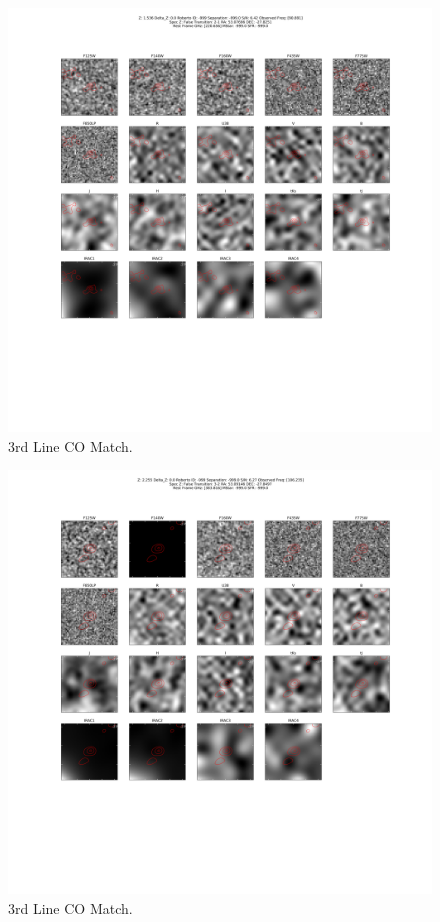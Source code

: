 \begin{figure}[tbp]
\centering \includegraphics[width=120mm]{Matched/ASPECS_Cutout_27.png}
\caption{3rd Line CO Match.}
\label{fig:Match_Three}
\end{figure}

\begin{figure}[tbp]
\centering \includegraphics[width=120mm]{Matched/ASPECS_Cutout_28.png}
\caption{3rd Line CO Match.}
\label{fig:Match_Three}
\end{figure}

